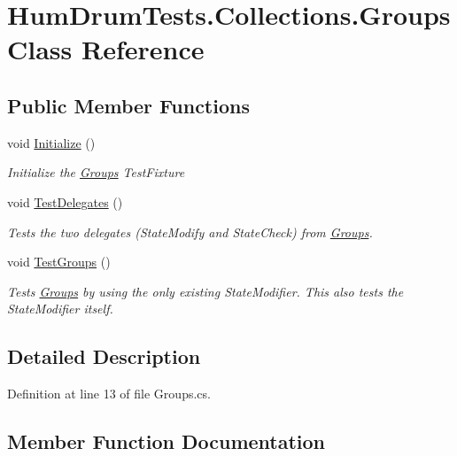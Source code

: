\hypertarget{classHumDrumTests_1_1Collections_1_1Groups}{}\section{Hum\+Drum\+Tests.\+Collections.\+Groups Class Reference}
\label{classHumDrumTests_1_1Collections_1_1Groups}
\subsection*{Public Member Functions}
\begin{DoxyCompactItemize}
\item 
void \hyperlink{classHumDrumTests_1_1Collections_1_1Groups_adb48b08d63e688ba5c76eded91de1c82}{Initialize} ()
\begin{DoxyCompactList}\small\item\em Initialize the \hyperlink{classHumDrumTests_1_1Collections_1_1Groups}{Groups} Test\+Fixture \end{DoxyCompactList}\item 
void \hyperlink{classHumDrumTests_1_1Collections_1_1Groups_a78213de4c9b4e5440c7fdb702b03b885}{Test\+Delegates} ()
\begin{DoxyCompactList}\small\item\em Tests the two delegates (State\+Modify and State\+Check) from \hyperlink{classHumDrumTests_1_1Collections_1_1Groups}{Groups}. \end{DoxyCompactList}\item 
void \hyperlink{classHumDrumTests_1_1Collections_1_1Groups_a1cbc36b01deb1bd68651bd3bc58be570}{Test\+Groups} ()
\begin{DoxyCompactList}\small\item\em Tests \hyperlink{classHumDrumTests_1_1Collections_1_1Groups}{Groups} by using the only existing State\+Modifier. This also tests the State\+Modifier itself. \end{DoxyCompactList}\end{DoxyCompactItemize}


\subsection{Detailed Description}


Definition at line 13 of file Groups.\+cs.



\subsection{Member Function Documentation}
